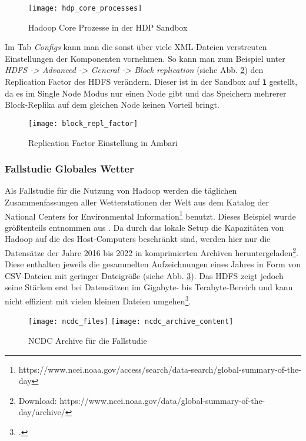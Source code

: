 \begin{figure}[ht]
    \centering
    \texttt{[image: hdp\_core\_processes]}
    \caption[Hadoop Core Prozesse in der HDP Sandbox]{Hadoop Core Prozesse in der HDP Sandbox}
    \label{fig:hdp core processes}
\end{figure}

Im Tab \textit{Configs} kann man die sonst über viele XML-Dateien verstreuten Einstellungen der Komponenten vornehmen. So kann man zum Beispiel unter \textit{HDFS -> Advanced -> General -> Block replication} (siehe Abb. \ref{fig:block replication factor}) den Replication Factor des HDFS verändern. Dieser ist in der Sandbox auf \verb|1| gestellt, da es im Single Node Modus nur einen Node gibt und das Speichern mehrerer Block-Replika auf dem gleichen Node keinen Vorteil bringt.  

\begin{figure}[ht]
    \centering
    \texttt{[image: block\_repl\_factor]}
    \caption[Replication Factor Einstellung in Ambari]{Replication Factor Einstellung in Ambari}
    \label{fig:block replication factor}
\end{figure}


\subsubsection*{Fallstudie Globales Wetter}
Als Fallstudie für die Nutzung von Hadoop werden die täglichen Zusammenfassungen aller Wetterstationen der Welt aus dem Katalog der National Centers for Environmental Information\footnote{https://www.ncei.noaa.gov/access/search/data-search/global-summary-of-the-day} benutzt. Dieses Beispiel wurde größtenteils entnommen aus . Da durch das lokale Setup die Kapazitäten von Hadoop auf die des Host-Computers beschränkt sind, werden hier nur die Datensätze der Jahre 2016 bis 2022 in komprimierten Archiven heruntergeladen\footnote{Download: https://www.ncei.noaa.gov/data/global-summary-of-the-day/archive/}. Diese enthalten jeweils die gesammelten Aufzeichnungen eines Jahres in Form von CSV-Dateien mit geringer Dateigröße (siehe Abb. \ref{fig:ncdc files local}). Das HDFS zeigt jedoch seine Stärken erst bei Datensätzen im Gigabyte- bis Terabyte-Bereich und kann nicht effizient mit vielen kleinen Dateien umgehen\footcite[vgl.][Assumptions and Goals -> Large Data Sets]{noauthor_apache_nodate-1}. 

\begin{figure}[ht]
    \centering
    \texttt{[image: ncdc\_files]}
    \texttt{[image: ncdc\_archive\_content]}
    \caption[NCDC Archive für die Fallstudie]{NCDC Archive für die Fallstudie}
    \label{fig:ncdc files local}
\end{figure}

